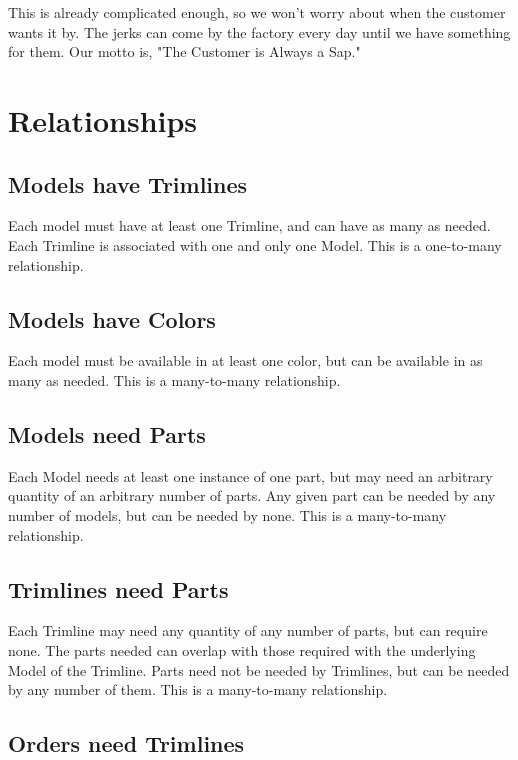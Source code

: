\documentclass[11pt,letterpaper,oneside]{amsart}
\begin{document}
This is already complicated enough, so we won't worry about when the customer wants it by.  The jerks can come by the factory every day until we have something for them.  Our motto is, "The Customer is Always a Sap."

\section*{Relationships}

\subsection*{Models have Trimlines}

Each model must have at least one Trimline, and can have as many as needed.  Each Trimline is associated with one and only one Model. This is a one-to-many relationship.

\subsection*{Models have Colors}

Each model must be available in at least one color, but can be available in as many as needed.  This is a many-to-many relationship.

\subsection*{Models need Parts}

Each Model needs at least one instance of one part, but may need an arbitrary quantity of an arbitrary number of parts.  Any given part can be needed by any number of models, but can be needed by none.  This is a many-to-many relationship.

\subsection*{Trimlines need Parts}

Each Trimline may need any quantity of any number of parts, but can require none.  The parts needed can overlap with those required with the underlying Model of the Trimline.  Parts need not be needed by Trimlines, but can be needed by any number of them.  This is a many-to-many relationship. 

\subsection*{Orders need Trimlines}
\end{document}

